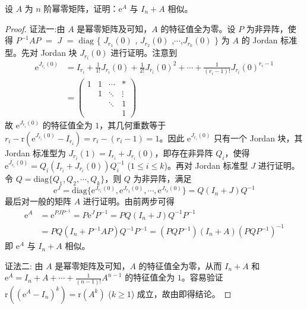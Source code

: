 \documentclass[../../main.tex]{subfiles}%
\begin{document}
\begin{proposition}\label{proposition:e^A与I_n+A相似}
设 $A$ 为 $n$ 阶幂零矩阵，证明：$\mathrm{e}^A$ 与 $I_n + A$ 相似。
\end{proposition}
\begin{proof}

{\color{blue}证法一:}由 $A$ 是幂零矩阵及可知，$A$ 的特征值全为零。设 $P$ 为非异阵，使得 $P^{-1}AP$ $=$ $J$ $=$ $\mathrm{diag}$ $\{$ $J_{r_1}(0)$ , $J_{r_2}(0)$ ,$\cdots$,$J_{r_k}(0)$ $\}$ 为 $A$ 的 Jordan 标准型。先对 Jordan 块 $J_{r_i}(0)$ 进行证明。注意到
\begin{align*}
\mathrm{e}^{J_{r_i}(0)} &= I_{r_i}+\frac{1}{1!}J_{r_i}(0)+\frac{1}{2!}J_{r_i}(0)^2+\cdots+\frac{1}{(r_i - 1)!}J_{r_i}(0)^{r_i - 1}\\
&= 
\begin{pmatrix}
1 & 1 & \cdots & * \\
& 1 & \ddots & \vdots \\
& & \ddots & 1 \\
& & & 1
\end{pmatrix}
\end{align*}
故 $\mathrm{e}^{J_{r_i}(0)}$ 的特征值全为 $1$，其几何重数等于 $r_i - \mathrm{r}(\mathrm{e}^{J_{r_i}(0)}-I_{r_i}) = r_i - (r_i - 1) = 1$。因此 $\mathrm{e}^{J_{r_i}(0)}$ 只有一个 Jordan 块，其 Jordan 标准型为 $J_{r_i}(1) = I_{r_i}+J_{r_i}(0)$，即存在非异阵 $Q_i$，使得 $\mathrm{e}^{J_{r_i}(0)} = Q_i(I_{r_i}+J_{r_i}(0))Q_i^{-1}$ ($1\leqslant  i\leqslant  k$)。再对 Jordan 标准型 $J$ 进行证明。令 $Q = \mathrm{diag}\{Q_1,Q_2,\cdots,Q_k\}$，则 $Q$ 为非异阵，满足
\[
\mathrm{e}^J = \mathrm{diag}\{\mathrm{e}^{J_{r_1}(0)},\mathrm{e}^{J_{r_2}(0)},\cdots,\mathrm{e}^{J_{r_k}(0)}\} = Q(I_n + J)Q^{-1}
\]
最后对一般的矩阵 $A$ 进行证明。由前两步可得
\begin{align*}
\mathrm{e}^A &= \mathrm{e}^{PJP^{-1}} = P\mathrm{e}^JP^{-1} = PQ(I_n + J)Q^{-1}P^{-1}\\
&= PQ(I_n + P^{-1}AP)Q^{-1}P^{-1} = (PQP^{-1})(I_n + A)(PQP^{-1})^{-1}
\end{align*}
即 $\mathrm{e}^A$ 与 $I_n + A$ 相似。

{\color{blue}证法二:}
由 $A$ 是幂零矩阵及可知，$A$ 的特征值全为零，从而 $I_n + A$ 和 $\mathrm{e}^A = I_n+A+\cdots+\frac{1}{(n - 1)!}A^{n - 1}$ 的特征值全为 $1$。容易验证 $\mathrm{r}((\mathrm{e}^A - I_n)^k) = \mathrm{r}(A^k)$ ($k\geqslant  1$) 成立，故由即得结论。

\end{proof}
\end{document}
